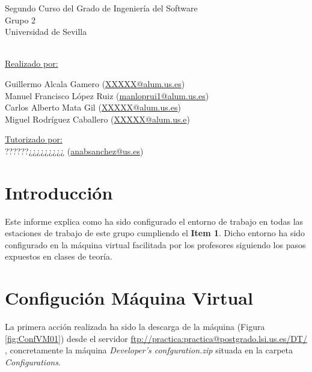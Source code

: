 \documentclass{scrartcl}
\begin{document}
\begin{titlepage}
\begin{center}
\begin{Large}
	Segundo Curso del Grado de Ingeniería del Software\\
	Grupo 2\\
	Universidad de Sevilla	
	\end{Large}\\
	\vspace*{0.4in}
	\underline{Realizado por:} \\
		\vspace*{0.1in}
		\begin{large}
		Guillermo Alcala Gamero (\href{mailto:manloprui1@alum.us.es}{XXXXX@alum.us.es})\\
		Manuel Francisco López Ruiz (\href{mailto:manloprui1@alum.us.es}{manloprui1@alum.us.es})\\
		Carlos Alberto Mata Gil
		(\href{mailto:manloprui1@alum.us.es}{XXXXX@alum.us.es})\\
		Miguel Rodríguez Caballero (\href{mailto:miguel.rc95@gmail.com}{XXXXX@alum.us.e})\\
		\end{large}
		\vspace*{0.2in}
		\underline{Tutorizado por:}\\
		\vspace*{0.1in}
		??????¿¿¿¿¿¿¿¿¿ (\href{mailto:anabsanchez@us.es}{anabsanchez@us.es})\\

	
	
\end{center}
\end{titlepage}
\newpage

\tableofcontents %

\newpage
\section{Introducción}
Este informe explica como ha sido configurado el entorno de trabajo en todas las estaciones de trabajo de este grupo cumpliendo el \textbf{Item 1}. Dicho entorno ha sido configurado en la máquina virtual facilitada por los profesores siguiendo los pasos expuestos en clases de teoría.
\section{Configución Máquina Virtual}
La primera acción realizada ha sido la descarga de la máquina  (Figura \ref{fig:ConfVM01}) desde el servidor \href{ftp://practica:practica@postgrado.lsi.us.es/DT/}{ftp://practica:practica@postgrado.lsi.us.es/DT/} , concretamente la máquina \textit{Developer's confguration.zip}  situada en la carpeta  \textit{Configurations}.
\end{document}
